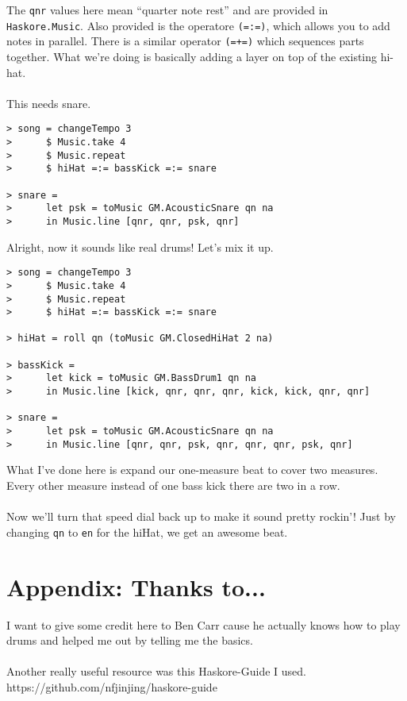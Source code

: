 \documentclass{article}
\begin{document}
The \lstinline{qnr} values here mean ``quarter note rest'' and are provided
in \lstinline{Haskore.Music}. Also provided is the operatore \lstinline{(=:=)},
which allows you to add notes in parallel. There is a similar operator
\lstinline{(=+=)} which sequences parts together. What we're doing is basically
adding a layer on top of the existing hi-hat.\\
\\
\indent This needs snare.
\begin{lstlisting}
> song = changeTempo 3
>      $ Music.take 4
>      $ Music.repeat
>      $ hiHat =:= bassKick =:= snare

> snare =
>      let psk = toMusic GM.AcousticSnare qn na
>      in Music.line [qnr, qnr, psk, qnr]
\end{lstlisting}
Alright, now it sounds like real drums! Let's mix it up.
\begin{lstlisting}
> song = changeTempo 3
>      $ Music.take 4
>      $ Music.repeat
>      $ hiHat =:= bassKick =:= snare

> hiHat = roll qn (toMusic GM.ClosedHiHat 2 na)

> bassKick =
>      let kick = toMusic GM.BassDrum1 qn na
>      in Music.line [kick, qnr, qnr, qnr, kick, kick, qnr, qnr]

> snare =
>      let psk = toMusic GM.AcousticSnare qn na
>      in Music.line [qnr, qnr, psk, qnr, qnr, qnr, psk, qnr]
\end{lstlisting}
What I've done here is expand our one-measure beat to cover two measures.
Every other measure instead of one bass kick there are two in a row.\\
\\
Now we'll turn that speed dial back up to make it sound pretty rockin'! Just
by changing \lstinline{qn} to \lstinline{en} for the hiHat, we get an awesome beat.
\pagebreak

\section*{Appendix: Thanks to...}
I want to give some credit here to Ben Carr cause he actually knows how to 
play drums and helped me out by telling me the basics.\\
\\
Another really useful resource was this Haskore-Guide I used.\\
https://github.com/nfjinjing/haskore-guide
\end{document}
